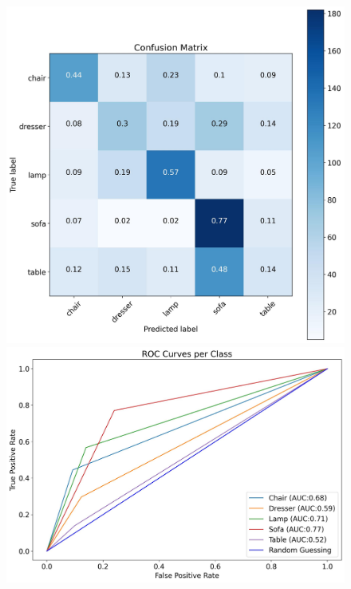\documentclass[11pt,a4paper]{article}
\begin{document}
\begin{figure}[H]
{{    \includegraphics[scale=0.13]{imgs/experiments/images/3/Experiment-3-TESTING-confusion-matrix.jpg}
    \includegraphics[scale=0.13]{imgs/experiments/images/3/Experiment-3-TESTING-ROC.jpg}
    }}
    \qquad
\end{figure}
\end{document}
